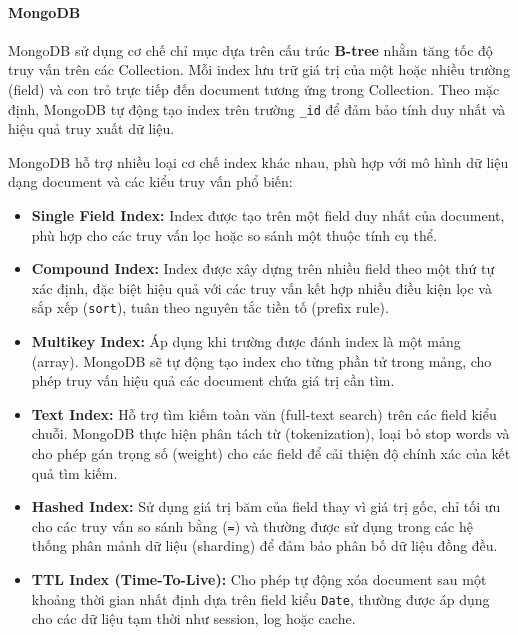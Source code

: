 \paragraph{MongoDB}
MongoDB sử dụng cơ chế chỉ mục dựa trên cấu trúc \textbf{B-tree} nhằm tăng tốc độ truy vấn trên các Collection. Mỗi index lưu trữ giá trị của một hoặc nhiều trường (field) và con trỏ trực tiếp đến document tương ứng trong Collection. Theo mặc định, MongoDB tự động tạo index trên trường \texttt{\_id} để đảm bảo tính duy nhất và hiệu quả truy xuất dữ liệu.

MongoDB hỗ trợ nhiều loại cơ chế index khác nhau, phù hợp với mô hình dữ liệu dạng document và các kiểu truy vấn phổ biến:

\begin{itemize}[label=$\circ$]
    \item \textbf{Single Field Index:} Index được tạo trên một field duy nhất của document, phù hợp cho các truy vấn lọc hoặc so sánh một thuộc tính cụ thể.
    
    \item \textbf{Compound Index:} Index được xây dựng trên nhiều field theo một thứ tự xác định, đặc biệt hiệu quả với các truy vấn kết hợp nhiều điều kiện lọc và sắp xếp (\texttt{sort}), tuân theo nguyên tắc tiền tố (prefix rule).
    
    \item \textbf{Multikey Index:} Áp dụng khi trường được đánh index là một mảng (array). MongoDB sẽ tự động tạo index cho từng phần tử trong mảng, cho phép truy vấn hiệu quả các document chứa giá trị cần tìm.
    
    \item \textbf{Text Index:} Hỗ trợ tìm kiếm toàn văn (full-text search) trên các field kiểu chuỗi. MongoDB thực hiện phân tách từ (tokenization), loại bỏ stop words và cho phép gán trọng số (weight) cho các field để cải thiện độ chính xác của kết quả tìm kiếm.
    
    \item \textbf{Hashed Index:} Sử dụng giá trị băm của field thay vì giá trị gốc, chỉ tối ưu cho các truy vấn so sánh bằng (\texttt{=}) và thường được sử dụng trong các hệ thống phân mảnh dữ liệu (sharding) để đảm bảo phân bố dữ liệu đồng đều.
    
    \item \textbf{TTL Index (Time-To-Live):} Cho phép tự động xóa document sau một khoảng thời gian nhất định dựa trên field kiểu \texttt{Date}, thường được áp dụng cho các dữ liệu tạm thời như session, log hoặc cache.
\end{itemize}


